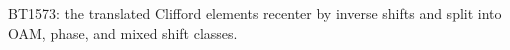 \begin{center}\small
BT1573: the translated Clifford elements recenter by inverse shifts and split into OAM, phase, and mixed shift classes.
\end{center}
